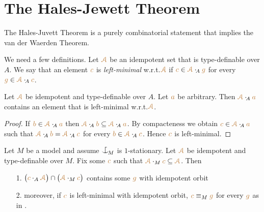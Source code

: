\documentclass[creche.tex]{subfiles}
\begin{document}
\section{The Hales-Jewett Theorem}
\label{HJ}


The Hales-Juvett Theorem is a purely combinatorial statement 
that implies the van der Waerden Theorem.

We need a few definitions. 
Let ${\color{brown}{\EuScript A}}$ be an idempotent set that is type-definable over $A$.
We say that an element ${\color{brown} c}$ is \emph{left-minimal\/} w.r.t.\@ ${\color{brown}{\EuScript A}}$ if 
${\color{brown} c}\in{\color{brown}{\EuScript A}}\cdot_{\!A}{\color{brown} g}$ for every ${\color{brown} g}\in{\color{brown}{\EuScript A}}\cdot_{\!A}{\color{brown} c}$.

\begin{proposition}\label{prop_minimal_existence1}
Let ${\color{brown}{\EuScript A}}$ be idempotent and type-definable over $A$.
Let ${\color{brown} a}$ be arbitrary.
Then ${\color{brown}{\EuScript A}}\cdot_{\!A}{\color{brown} a}$ contains an element that is left-minimal w.r.t.\@ ${\color{brown}{\EuScript A}}$.
\end{proposition}
\begin{proof}
If ${\color{brown} b}\in{\color{brown}{\EuScript A}}\cdot_{\!A}{\color{brown} a}$ then ${\color{brown}{\EuScript A}}\cdot_{\!A}{\color{brown} b}\subseteq{\color{brown}{\EuScript A}}\cdot_{\!A}{\color{brown} a}$.
By compacteness we obtain ${\color{brown} c}\in{\color{brown}{\EuScript A}}\cdot_{\!A}{\color{brown} a}$ such that ${\color{brown}{\EuScript A}}\cdot_{\!A}{\color{brown} b}={\color{brown}{\EuScript A}}\cdot_{\!A}{\color{brown} c}$ for every ${\color{brown} b}\in{\color{brown}{\EuScript A}}\cdot_{\!A}{\color{brown} c}$. Hence ${\color{brown} c}$ is left-minimal.
\end{proof}

\begin{proposition}\label{prop_minimal_existence2}
Let $M$ be a model and assume $\nonforkc_{\!M}$ is $1$-stationary.
Let ${\color{brown}{\EuScript A}}$ be idempotent and type-definable over $M$.
Fix some ${\color{brown} c}$ %
such that ${\color{brown}{\EuScript A}}\cdot_M{\color{brown} c}\subseteq{\color{brown}{\EuScript A}}$.
Then
\begin{itemize}
\item[1.] $\big({\color{brown} c}\cdot_A{\color{brown}{\EuScript A}}\big)\cap\big({\color{brown}{\EuScript A}}\cdot_M{\color{brown} c}\big)$ 
contains some ${\color{brown} g}$ with idempotent orbit

\item[2.] moreover, if ${\color{brown} c}$ is left-minimal with idempotent orbit, ${\color{brown} c}\equiv_M{\color{brown} g}$ for every ${\color{brown} g}$ as in .
\end{itemize} 
\end{proposition}
\end{document}
